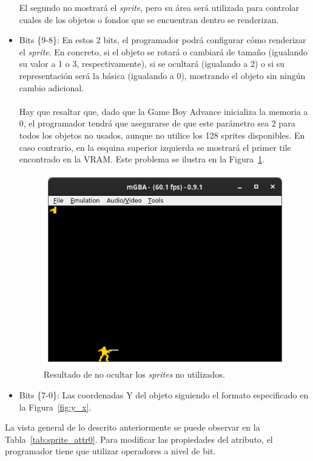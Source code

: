 \begin{itemize}
		El segundo no mostrará el \textit{sprite}, pero su área será utilizada para controlar cuales de los objetos o fondos que se encuentran dentro se renderizan.

	\item Bits \{9-8\}: En estos 2 bits, el programador podrá configurar cómo renderizar el \textit{sprite}. En concreto, si el objeto se rotará o cambiará de tamaño (igualando su valor a 1 o 3, respectivamente), si se ocultará (igualando a 2) o si su representación será la básica (igualando a 0), mostrando el objeto sin ningún cambio adicional. \\ \\
		Hay que resaltar que, dado que la Game Boy Advance inicializa la memoria a 0, el programador tendrá que asegurarse de que este parámetro sea 2 para todos los objetos no usados, aunque no utilice los 128 sprites disponibles. En caso contrario, en la esquina superior izquierda se mostrará el primer tile encontrado en la VRAM. Este problema se ilustra en la Figura~\ref{fig:artefacto}.

		\begin{figure}[h]
			\centering
			\includegraphics[width=.5\textwidth]{capitulos/capitulo3/artefacto.png}
			\caption{Resultado de no ocultar los \textit{sprites} no utilizados.}
			\label{fig:artefacto}
		\end{figure}
		\FloatBarrier

	\item Bits \{7-0\}: Las coordenadas Y del objeto siguiendo el formato especificado en la Figura~\ref{fig:y_x}.
\end{itemize}

La vista general de lo descrito anteriormente se puede observar en la Tabla~\ref{tab:sprite_attr0}. Para modificar las propiedades del atributo, el programador tiene que utilizar operadores a nivel de bit.

